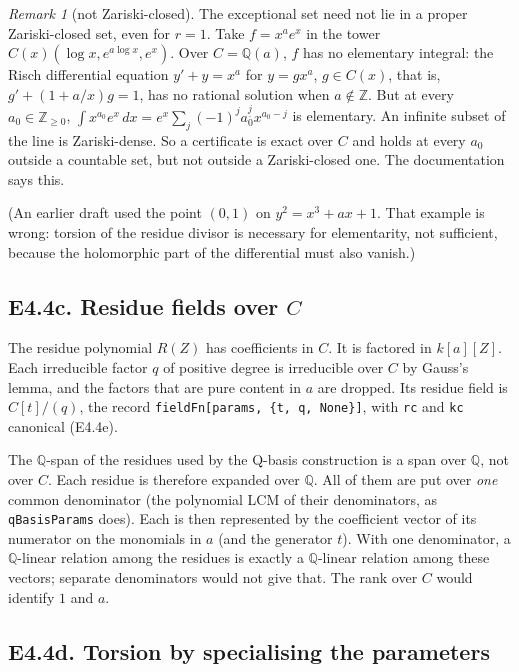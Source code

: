 \documentclass[11pt]{article}
\theoremstyle{definition}
\theoremstyle{remark}
\newtheorem{remark}[theorem]{Remark}
\newcommand{\Q}{\mathbb{Q}}
\newcommand{\Z}{\mathbb{Z}}
\newcommand{\code}[1]{\texttt{#1}}
\begin{document}
\begin{remark}[not Zariski-closed]
The exceptional set need not lie in a proper Zariski-closed set, even for $r=1$. Take
$f=x^ae^x$ in the tower $C(x)(\log x, e^{a\log x}, e^x)$. Over $C=\Q(a)$, $f$ has no
elementary integral: the Risch differential equation $y'+y=x^a$ for $y=gx^a$, $g\in
C(x)$, that is, $g'+(1+a/x)g=1$, has no rational solution when $a\notin\Z$. But at every
$a_0\in\Z_{\ge0}$, $\int x^{a_0}e^x\,dx=e^x\sum_{j}(-1)^j a_0^{\underline{j}}x^{a_0-j}$
is elementary. An infinite subset of the line is Zariski-dense. So a certificate is
exact over $C$ and holds at every $a_0$ outside a countable set, but not outside a
Zariski-closed one. The documentation says this.

(An earlier draft used the point $(0,1)$ on $y^2=x^3+ax+1$. That example is wrong:
torsion of the residue divisor is necessary for elementarity, not sufficient, because
the holomorphic part of the differential must also vanish.)
\end{remark}

\subsection*{E4.4c. Residue fields over $C$}
The residue polynomial $R(Z)$ has coefficients in $C$. It is factored in $k[a][Z]$.
Each irreducible factor $q$ of positive degree is irreducible over $C$ by Gauss's lemma,
and the factors that are pure content in $a$ are dropped. Its residue field is
$C[t]/(q)$, the record \code{fieldFn[params, \{t, q, None\}]}, with \code{rc} and
\code{kc} canonical (E4.4e).

The $\Q$-span of the residues used by the Q-basis construction is a span over $\Q$, not
over $C$. Each residue is therefore expanded over $\Q$. All of them are put over
\emph{one} common denominator (the polynomial LCM of their denominators, as
\code{qBasisParams} does). Each is then represented by the coefficient vector of its
numerator on the monomials in $a$ (and the generator $t$). With one denominator, a
$\Q$-linear relation among the residues is exactly a $\Q$-linear relation among these
vectors; separate denominators would not give that. The rank over $C$ would identify
$1$ and $a$.

\subsection*{E4.4d. Torsion by specialising the parameters}
\end{document}

